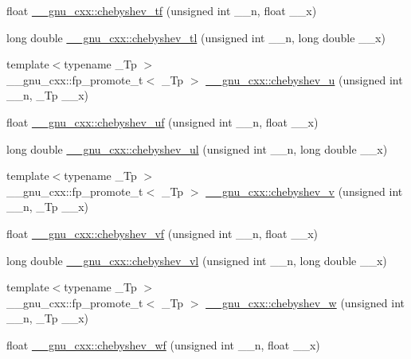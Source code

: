 \begin{DoxyCompactItemize}
\item 
float \hyperlink{group__mathsf__gnu_gab8cdb55702d9c8b85af4ecc3d8c6a134}{\+\_\+\+\_\+gnu\+\_\+cxx\+::chebyshev\+\_\+tf} (unsigned int \+\_\+\+\_\+n, float \+\_\+\+\_\+x)
\item 
long double \hyperlink{group__mathsf__gnu_ga0c421700d244cdf58e3ac5ff267664d1}{\+\_\+\+\_\+gnu\+\_\+cxx\+::chebyshev\+\_\+tl} (unsigned int \+\_\+\+\_\+n, long double \+\_\+\+\_\+x)
\item 
{\footnotesize template$<$typename \+\_\+\+Tp $>$ }\\\+\_\+\+\_\+gnu\+\_\+cxx\+::fp\+\_\+promote\+\_\+t$<$ \+\_\+\+Tp $>$ \hyperlink{group__mathsf__gnu_gafa90c06bdedb8459f20576297cf1608f}{\+\_\+\+\_\+gnu\+\_\+cxx\+::chebyshev\+\_\+u} (unsigned int \+\_\+\+\_\+n, \+\_\+\+Tp \+\_\+\+\_\+x)
\item 
float \hyperlink{group__mathsf__gnu_ga4b28c2a079eae2e9612c9902801ca256}{\+\_\+\+\_\+gnu\+\_\+cxx\+::chebyshev\+\_\+uf} (unsigned int \+\_\+\+\_\+n, float \+\_\+\+\_\+x)
\item 
long double \hyperlink{group__mathsf__gnu_ga11ec202d6aacafba1182e962ecf02978}{\+\_\+\+\_\+gnu\+\_\+cxx\+::chebyshev\+\_\+ul} (unsigned int \+\_\+\+\_\+n, long double \+\_\+\+\_\+x)
\item 
{\footnotesize template$<$typename \+\_\+\+Tp $>$ }\\\+\_\+\+\_\+gnu\+\_\+cxx\+::fp\+\_\+promote\+\_\+t$<$ \+\_\+\+Tp $>$ \hyperlink{group__mathsf__gnu_ga32b7decd0002f542d2c9187c5f0846c6}{\+\_\+\+\_\+gnu\+\_\+cxx\+::chebyshev\+\_\+v} (unsigned int \+\_\+\+\_\+n, \+\_\+\+Tp \+\_\+\+\_\+x)
\item 
float \hyperlink{group__mathsf__gnu_gaa9635a0da4bdeaa8060ae5cf03c3a12d}{\+\_\+\+\_\+gnu\+\_\+cxx\+::chebyshev\+\_\+vf} (unsigned int \+\_\+\+\_\+n, float \+\_\+\+\_\+x)
\item 
long double \hyperlink{group__mathsf__gnu_gae387ee1bfcd52555ad4d690f5888a078}{\+\_\+\+\_\+gnu\+\_\+cxx\+::chebyshev\+\_\+vl} (unsigned int \+\_\+\+\_\+n, long double \+\_\+\+\_\+x)
\item 
{\footnotesize template$<$typename \+\_\+\+Tp $>$ }\\\+\_\+\+\_\+gnu\+\_\+cxx\+::fp\+\_\+promote\+\_\+t$<$ \+\_\+\+Tp $>$ \hyperlink{group__mathsf__gnu_gaa156c6c21e99104ebcb627e92aceada0}{\+\_\+\+\_\+gnu\+\_\+cxx\+::chebyshev\+\_\+w} (unsigned int \+\_\+\+\_\+n, \+\_\+\+Tp \+\_\+\+\_\+x)
\item 
float \hyperlink{group__mathsf__gnu_gae6d468cee53df584e40afe294127b090}{\+\_\+\+\_\+gnu\+\_\+cxx\+::chebyshev\+\_\+wf} (unsigned int \+\_\+\+\_\+n, float \+\_\+\+\_\+x)

\end{DoxyCompactItemize}
